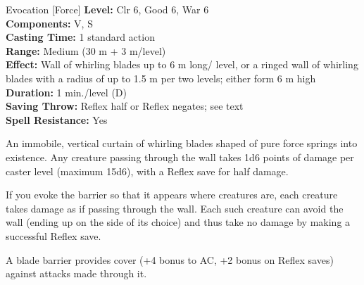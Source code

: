 {Evocation [Force]}
{
	\textbf{Level:}
	Clr 6, Good 6, War 6\\
	\textbf{Components:}
	V, S\\
	\textbf{Casting Time:}
	1 standard action\\
	\textbf{Range:}
	Medium (30 m + 3 m/level)\\
	\textbf{Effect:}
	Wall of whirling blades up to 6 m long/ level, or a ringed wall of whirling blades with a radius of up to 1.5 m per two levels; either form 6 m high\\
	\textbf{Duration:}
	1 min./level (D)\\
	\textbf{Saving Throw:}
	Reflex half or Reflex negates; see text\\
	\textbf{Spell Resistance:}
	Yes\\
}
{
	An immobile, vertical curtain of whirling blades shaped of pure force springs into existence. Any creature passing through the wall takes 1d6 points of damage per caster level (maximum 15d6), with a Reflex save for half damage.

	If you evoke the barrier so that it appears where creatures are, each creature takes damage as if passing through the wall. Each such creature can avoid the wall (ending up on the side of its choice) and thus take no damage by making a successful Reflex save.

	A blade barrier provides cover (+4 bonus to AC, +2 bonus on Reflex saves) against attacks made through it.

}
